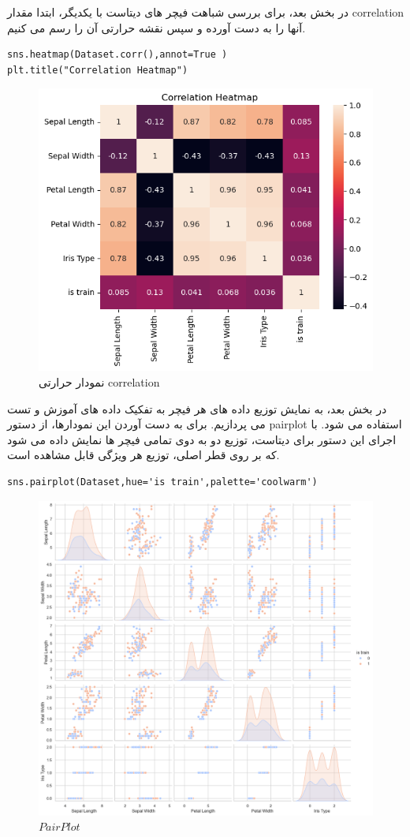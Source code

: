 در بخش بعد، برای بررسی شباهت فیچر های دیتاست با یکدیگر، ابتدا مقدار correlation آنها را به دست آورده و سپس نقشه حرارتی آن را رسم می کنیم.
\begin{verbatim}
sns.heatmap(Dataset.corr(),annot=True )
plt.title("Correlation Heatmap")
\end{verbatim}
\begin{figure}[H]
	\centering
	\includegraphics[width=0.7\linewidth]{../img/12}
	\caption{نمودار حرارتی correlation}
	\label{fig:12}
\end{figure}
در بخش بعد، به نمایش توزیع داده های هر فیچر به تفکیک داده های آموزش و تست می پردازیم. برای به دست آوردن این نمودارها، از دستور pairplot استفاده می شود. با اجرای این دستور برای دیتاست، توزیع دو به دوی تمامی فیچر ها نمایش داده می شود که بر روی قطر اصلی، توزیع هر ویژگی قابل مشاهده است.
\begin{verbatim}
sns.pairplot(Dataset,hue='is train',palette='coolwarm')
\end{verbatim}
\begin{figure}[H]
	\centering
	\includegraphics[width=1\linewidth]{../img/13}
	\caption{$Pair Plot$}
	\label{fig:13}
\end{figure}

